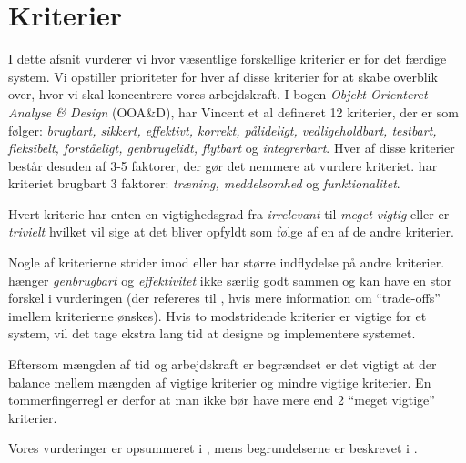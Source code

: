 \section{Kriterier}
\label{sec:kriterier}

I dette afsnit vurderer vi hvor væsentlige forskellige kriterier er for det færdige system. Vi opstiller prioriteter for hver af disse kriterier for at skabe overblik over, hvor vi skal koncentrere vores arbejdskraft. I bogen \emph{Objekt Orienteret Analyse \& Design} (OOA\&D)\cite{ooad}, har Vincent et al defineret 12 kriterier, der er som følger: \emph{brugbart, sikkert, effektivt, korrekt, pålideligt, vedligeholdbart, testbart, fleksibelt, forståeligt, genbrugelidt, flytbart} og \emph{integrerbart}. Hver af disse kriterier består desuden af 3-5 faktorer, der gør det nemmere at vurdere kriteriet. \Fx har kriteriet brugbart 3 faktorer: \emph{træning, meddelsomhed} og \emph{funktionalitet}.

Hvert kriterie har enten en vigtighedsgrad fra \emph{irrelevant} til \emph{meget vigtig} eller er \emph{trivielt} hvilket vil sige at det bliver opfyldt som følge af en af de andre kriterier.
 
Nogle af kriterierne strider imod eller har større indflydelse på andre kriterier. \Fx hænger \emph{genbrugbart} og \emph{effektivitet} ikke særlig godt sammen og kan have en stor forskel i vurderingen (der refereres til \cite[s.~18]{crit}, hvis mere information om ``trade-offs'' imellem kriterierne ønskes). Hvis to modstridende kriterier er vigtige for et system, vil det tage ekstra lang tid at designe og implementere systemet.

Eftersom mængden af tid og arbejdskraft er begrændset er det vigtigt at der balance mellem mængden af vigtige kriterier og mindre vigtige kriterier. En tommerfingerregl er derfor at man ikke bør have mere end 2 ``meget vigtige'' kriterier.

Vores vurderinger er opsummeret i , mens begrundelserne er beskrevet i .







